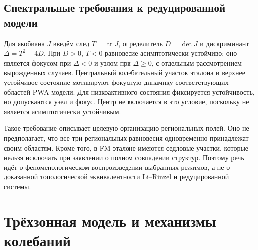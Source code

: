 \subsection{Спектральные требования к редуцированной модели}
Для якобиана $J$ введём след $T=\operatorname{tr}J$, определитель $D=\det J$ и дискриминант $\Delta=T^2-4D$. При $D>0$, $T<0$ равновесие асимптотически устойчиво: оно является фокусом при $\Delta<0$ и узлом при $\Delta\geq0$, с отдельным рассмотрением вырожденных случаев. Центральный колебательный участок эталона и верхнее устойчивое состояние мотивируют фокусную динамику соответствующих областей PWA-модели. Для низкоактивного состояния фиксируется устойчивость, но допускаются узел и фокус. Центр не включается в это условие, поскольку не является асимптотически устойчивым.

Такое требование описывает целевую организацию региональных полей. Оно не предполагает, что все три региональных равновесия одновременно принадлежат своим областям. Кроме того, в FM-эталоне имеются седловые участки, которые нельзя исключать при заявлении о полном совпадении структур. Поэтому речь идёт о феноменологическом воспроизведении выбранных режимов, а не о доказанной топологической эквивалентности Li--Rinzel и редуцированной системы.

\section{Трёхзонная модель и механизмы колебаний}
